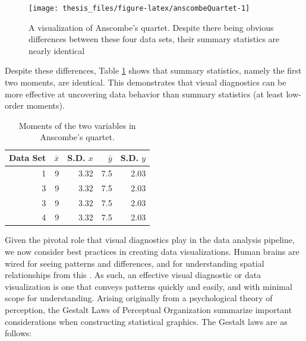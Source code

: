 \documentclass[11pt,]{isuthesis}
\begin{document}
\begin{figure}[!htbp]

{\centering \texttt{[image: thesis\_files/figure-latex/anscombeQuartet-1]} 

}

\caption{A visualization of Anscombe's quartet. Despite there being obvious differences between these four data sets, their summary statistics are nearly identical}\label{fig:anscombeQuartet}
\end{figure}

Despite these differences, Table \ref{tab:anscombeStats} shows that summary statistics, namely the first two moments, are identical.
This demonstrates that visual diagnostics can be more effective at uncovering data behavior than summary statistics (at least low-order moments).

\begin{table}[!htbp]
\centering
\begin{tabular}{| r | r | r | r | r |}
\hline
Data Set & $\bar{x}$ & S.D. $x$ & $\bar{y}$ & S.D. $y$ \\
\hline
1 & 9 & 3.32 & 7.5 & 2.03 \\
\hline
3 & 9 & 3.32 & 7.5 & 2.03 \\
\hline
3 & 9 & 3.32 & 7.5 & 2.03 \\
\hline
4 & 9 & 3.32 & 7.5 & 2.03 \\
\hline
\end{tabular}
\caption{Moments of the two variables in Anscombe's quartet.}
\label{tab:anscombeStats}
\end{table}

Given the pivotal role that visual diagnostics play in the data analysis pipeline, we now consider best practices in creating data visualizations.
Human brains are wired for seeing patterns and differences, and for understanding spatial relationships from this \citep{telea2014data}.
As such, an effective visual diagnostic or data visualization is one that conveys patterns quickly and easily, and with minimal scope for understanding.
Arising originally from a psychological theory of perception, the Gestalt Laws of Perceptual Organization \citep{Goldstein2016-un} summarize important considerations when constructing statistical graphics.
The Gestalt laws are as follows:
\end{document}
